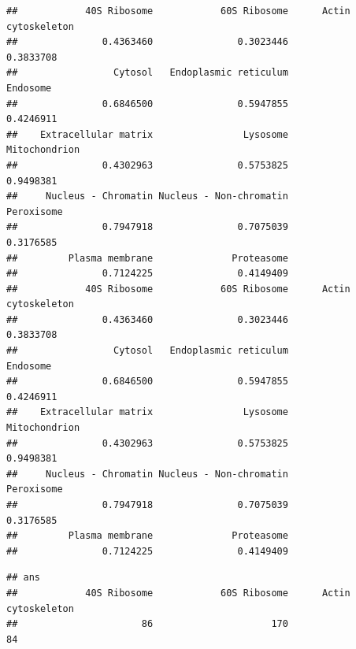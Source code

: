\begin{knitrout}
\color{fgcolor}\begin{kframe}
\begin{alltt}
 \hlkwb{<-}   \hlstd{=} \hlstd{,}  \hlstd{=} \hlstd{,}  \hlstd{=} \hlstd{,}  \hlstd{=} \hlstd{))}
\end{alltt}
\begin{verbatim}
##            40S Ribosome            60S Ribosome      Actin cytoskeleton 
##               0.4363460               0.3023446               0.3833708 
##                 Cytosol   Endoplasmic reticulum                Endosome 
##               0.6846500               0.5947855               0.4246911 
##    Extracellular matrix                Lysosome           Mitochondrion 
##               0.4302963               0.5753825               0.9498381 
##     Nucleus - Chromatin Nucleus - Non-chromatin              Peroxisome 
##               0.7947918               0.7075039               0.3176585 
##         Plasma membrane              Proteasome 
##               0.7124225               0.4149409
##            40S Ribosome            60S Ribosome      Actin cytoskeleton 
##               0.4363460               0.3023446               0.3833708 
##                 Cytosol   Endoplasmic reticulum                Endosome 
##               0.6846500               0.5947855               0.4246911 
##    Extracellular matrix                Lysosome           Mitochondrion 
##               0.4302963               0.5753825               0.9498381 
##     Nucleus - Chromatin Nucleus - Non-chromatin              Peroxisome 
##               0.7947918               0.7075039               0.3176585 
##         Plasma membrane              Proteasome 
##               0.7124225               0.4149409
\end{verbatim}
\begin{alltt}
 \hlkwb{<-}   \hlstd{=} \hlstd{,}  \hlstd{=} \hlstd{,}  \hlstd{=} \hlstd{,}  
\end{alltt}
\begin{verbatim}
## ans
##            40S Ribosome            60S Ribosome      Actin cytoskeleton 
##                      86                     170                      84 

\end{verbatim}
\end{kframe}
\end{knitrout}
